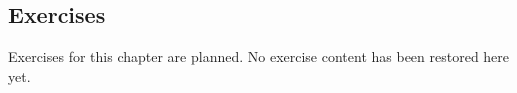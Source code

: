 \subsection*{Exercises}

Exercises for this chapter are planned. No exercise content has been restored
here yet.
